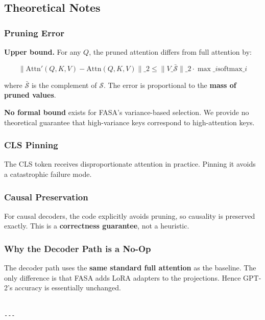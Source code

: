 \subsection{Theoretical Notes}

\subsubsection{Pruning Error}

\textbf{Upper bound.} For any $Q$, the pruned attention differs from full attention by:

\[
\|\text{Attn}'(Q, K, V) - \text{Attn}(Q, K, V)\|\_2 \leq \|V\_{\bar{\mathcal{S}}}\|\_2 \cdot \max\_i \text{softmax}\_i
\tag{4.8}
\]

where $\bar{\mathcal{S}}$ is the complement of $\mathcal{S}$. The error is 
proportional to the \textbf{mass of pruned values}.

\textbf{No formal bound} exists for FASA's variance-based selection. We provide 
no theoretical guarantee that high-variance keys correspond to high-attention 
keys.

\subsubsection{CLS Pinning}

The CLS token receives disproportionate attention in practice. Pinning it 
avoids a catastrophic failure mode.

\subsubsection{Causal Preservation}

For causal decoders, the code explicitly avoids pruning, so causality is 
preserved exactly. This is a \textbf{correctness guarantee}, not a heuristic.

\subsubsection{Why the Decoder Path is a No-Op}

The decoder path uses the \textbf{same standard full attention} as the baseline. 
The only difference is that FASA adds LoRA adapters to the projections. 
Hence GPT-2's accuracy is essentially unchanged.
\begin{lstlisting}

---
\end{lstlisting}

